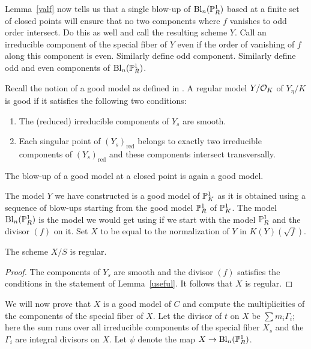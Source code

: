 Lemma~\ref{valf} now tells us that a single blow-up of $\mathrm{Bl}_n(\P^1_R)$ based at a finite set of closed points will ensure that no two components where $f$ vanishes to odd order intersect. Do this as well and call the resulting scheme $Y$. Call an irreducible component of the special fiber of $Y$ {\color{blue} even} if the order of vanishing of $f$ along this component is even. Similarly define {\color{blue} odd} component. Similarly define odd and even components of $\mathrm{Bl}_n(\P^1_R)$.

Recall the notion of a good model as defined in \cite[1.8]{liulor}. A regular model $Y/\O_K$ of $Y_\eta/K$ is {\color{blue}good} if it satisfies the following two conditions:
\begin{enumerate}
 \item The (reduced) irreducible components of $Y_s$ are smooth.
 \item Each singular point of $(Y_s)_{\mathrm{red}}$ belongs to exactly two irreducible components of $(Y_s)_{\mathrm{red}}$ and these components intersect transversally.
\end{enumerate}
The blow-up of a good model at a closed point is again a good model.

The model $Y$ we have constructed is a good model of $\P^1_K$ as it is obtained using a sequence of blow-ups starting from the good model $\P^1_R$ of $\P^1_K$. The model $\mathrm{Bl}_n(\P^1_R)$ is the model we would get using \cite[Lemma~1.9]{liulor} if we start with the model $\P^1_R$ and the divisor $(f)$ on it. Set $X$ to be equal to the normalization of $Y$ in $K(Y)(\sqrt{f})$. 

\begin{thm}\label{Xisregular}
 The scheme $X/S$ is regular.
\end{thm}
\begin{proof}
 The components of $Y_s$ are smooth and the divisor $(f)$ satisfies the conditions in the statement of Lemma~\ref{useful}. It follows that $X$ is regular.
\end{proof}

We will now prove that $X$ is a good model of $C$ and compute the multiplicities of the components of the special fiber of $X$. Let the divisor of $t$ on $X$ be $\sum m_i \Gamma_i$; here the sum runs over all irreducible components of the special fiber $X_s$ and the $\Gamma_i$ are integral divisors on $X$. Let $\psi$ denote the map $X \rightarrow \mathrm{Bl}_n(\P^1_R)$.


